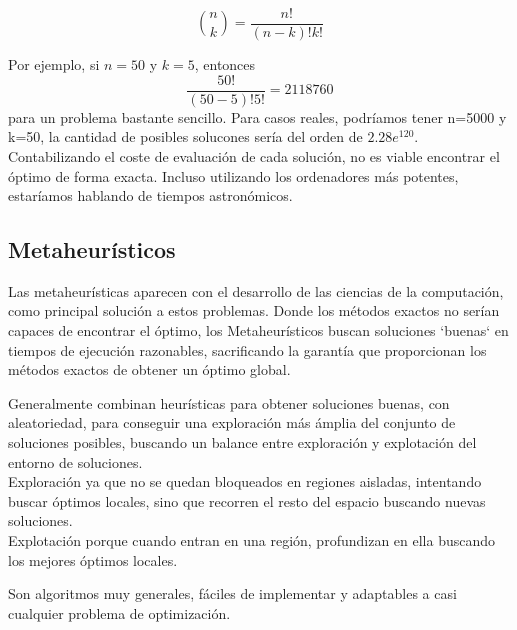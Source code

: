 \documentclass[12pt,a4paper]{book}
\begin{document}
$$
    \binom{n}{k} = \frac{n!}{(n-k)!k!}
$$

Por ejemplo, si $n=50$ y $k=5$, entonces
$$
    \frac{50!}{(50-5)!5!}=2118760
$$
para un problema bastante sencillo. Para casos reales, podríamos tener n=5000 y k=50, la cantidad de posibles solucones sería del orden de $2.28  e^{120}$. Contabilizando el coste de 
evaluación de cada solución, no es viable encontrar el óptimo de forma exacta. Incluso utilizando los ordenadores más potentes, estaríamos hablando de tiempos astronómicos.

\subsection{Metaheurísticos}

Las metaheurísticas aparecen con el desarrollo de las ciencias de la computación, como principal solución a estos problemas. Donde los métodos exactos no serían capaces de encontrar el óptimo,
los Metaheurísticos buscan soluciones `buenas` en tiempos de ejecución razonables, sacrificando la garantía que proporcionan los métodos exactos de obtener un óptimo global.

Generalmente combinan heurísticas para obtener soluciones buenas, con aleatoriedad, para conseguir una exploración
más ámplia del conjunto de soluciones posibles, buscando un balance entre exploración y explotación del entorno de soluciones.\\
Exploración ya que no se quedan bloqueados en regiones aisladas, intentando buscar óptimos locales, sino que recorren el resto del espacio buscando nuevas soluciones.\\
Explotación porque cuando entran en una región, profundizan en ella buscando los mejores óptimos locales.

Son algoritmos muy generales, fáciles de implementar y adaptables a casi 
cualquier problema de optimización.
\end{document}
